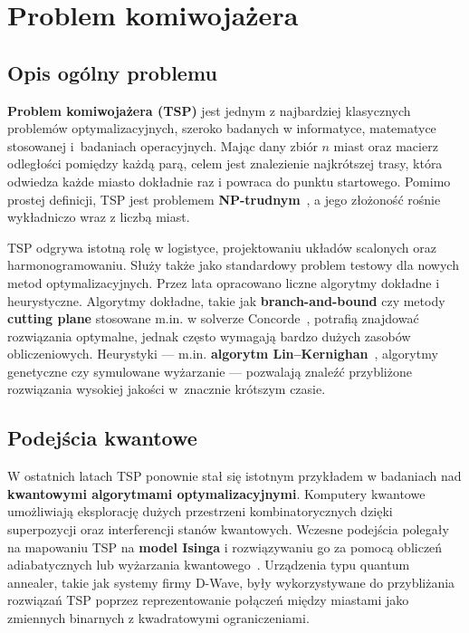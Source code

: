 \section{Problem komiwojażera}

\subsection{Opis ogólny problemu}

\textbf{Problem komiwojażera (TSP)} jest jednym z najbardziej klasycznych problemów optymalizacyjnych, szeroko badanych w informatyce, matematyce stosowanej i~badaniach operacyjnych. Mając dany zbiór $n$ miast oraz macierz odległości pomiędzy każdą parą, celem jest znalezienie najkrótszej trasy, która odwiedza każde miasto dokładnie raz i powraca do punktu startowego. Pomimo prostej definicji, TSP jest problemem \textbf{NP-trudnym}~\cite{garey1979computers}, a jego złożoność rośnie wykładniczo wraz z liczbą miast.

TSP odgrywa istotną rolę w logistyce, projektowaniu układów scalonych oraz harmonogramowaniu. Służy także jako standardowy problem testowy dla nowych metod optymalizacyjnych. Przez lata opracowano liczne algorytmy dokładne i heurystyczne. Algorytmy dokładne, takie jak \textbf{branch-and-bound} czy metody \textbf{cutting plane} stosowane m.in. w solverze Concorde~\cite{applegate2006concorde}, potrafią znajdować rozwiązania optymalne, jednak często wymagają bardzo dużych zasobów obliczeniowych. Heurystyki — m.in. \textbf{algorytm Lin–Kernighan}~\cite{lin1973effective}, algorytmy genetyczne czy symulowane wyżarzanie — pozwalają znaleźć przybliżone rozwiązania wysokiej jakości w~znacznie krótszym czasie.

\subsection{Podejścia kwantowe}

W ostatnich latach TSP ponownie stał się istotnym przykładem w badaniach nad \textbf{kwantowymi algorytmami optymalizacyjnymi}. Komputery kwantowe umożliwiają eksplorację dużych przestrzeni kombinatorycznych dzięki superpozycji oraz interferencji stanów kwantowych. Wczesne podejścia polegały na mapowaniu TSP na \textbf{model Isinga} i rozwiązywaniu go za pomocą obliczeń adiabatycznych lub wyżarzania kwantowego~\cite{lucas2014ising}. Urządzenia typu quantum annealer, takie jak systemy firmy D-Wave, były wykorzystywane do przybliżania rozwiązań TSP poprzez reprezentowanie połączeń między miastami jako zmiennych binarnych z kwadratowymi ograniczeniami.

